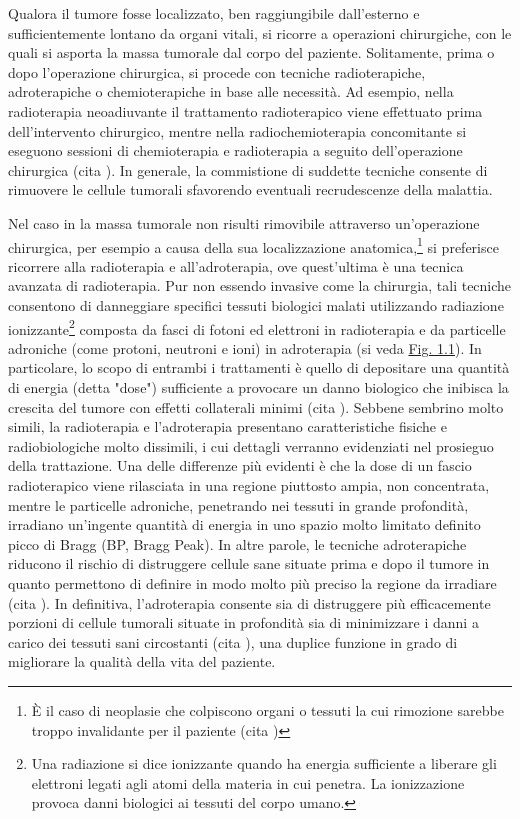 \documentclass[12pt,a4paper,twoside]{report}
\begin{document}
	Qualora il tumore fosse localizzato, ben raggiungibile dall'esterno e sufficientemente lontano da organi vitali, si ricorre a operazioni chirurgiche, con le quali si asporta la massa tumorale dal corpo del paziente. Solitamente, prima o dopo l'operazione chirurgica, si procede con tecniche radioterapiche, adroterapiche o chemioterapiche in base alle necessità. Ad esempio, nella radioterapia neoadiuvante il trattamento radioterapico viene effettuato prima dell'intervento chirurgico, mentre nella radiochemioterapia concomitante si eseguono sessioni di chemioterapia e radioterapia a seguito dell'operazione chirurgica (cita
	). In generale, la commistione di suddette tecniche consente di rimuovere le cellule tumorali sfavorendo eventuali recrudescenze della malattia.
	
	Nel caso in la massa tumorale non risulti rimovibile attraverso un'operazione chirurgica, per esempio a causa della sua localizzazione anatomica,\footnote{\`E il caso di neoplasie che colpiscono organi o tessuti la cui rimozione sarebbe troppo invalidante per il paziente (cita
	)} si preferisce ricorrere alla radioterapia e all'adroterapia, ove quest'ultima è una tecnica avanzata di radioterapia. Pur non essendo invasive come la chirurgia, tali tecniche consentono di danneggiare specifici tessuti biologici malati utilizzando radiazione ionizzante\footnote{Una radiazione si dice ionizzante quando ha energia sufficiente a liberare gli elettroni legati agli atomi della materia in cui penetra. La ionizzazione provoca danni biologici ai tessuti del corpo umano.} composta da fasci di fotoni ed elettroni in radioterapia e da particelle adroniche (come protoni, neutroni e ioni) in adroterapia (si veda \hyperref[fig:simulation]{Fig. 1.1}). In particolare, lo scopo di entrambi i trattamenti è quello di depositare una quantità di energia (detta "dose") sufficiente a provocare un danno biologico che inibisca la crescita del tumore con effetti collaterali minimi (cita
	). Sebbene sembrino molto simili, la radioterapia e l'adroterapia presentano caratteristiche fisiche e radiobiologiche molto dissimili, i cui dettagli verranno evidenziati nel prosieguo della trattazione. Una delle differenze più evidenti è che la dose di un fascio radioterapico viene rilasciata in una regione piuttosto ampia, non concentrata, mentre le particelle adroniche, penetrando nei tessuti in grande profondità, irradiano un'ingente quantità di energia in uno spazio molto limitato definito picco di Bragg (BP, Bragg Peak). In altre parole, le tecniche adroterapiche riducono il rischio di distruggere cellule sane situate prima e dopo il tumore in quanto permettono di definire in modo molto più preciso la regione da irradiare (cita
	). In definitiva, l'adroterapia consente sia di distruggere più efficacemente porzioni di cellule tumorali situate in profondità sia di minimizzare i danni a carico dei tessuti sani circostanti (cita
	), una duplice funzione in grado di migliorare la qualità della vita del paziente.
	
\end{document}
